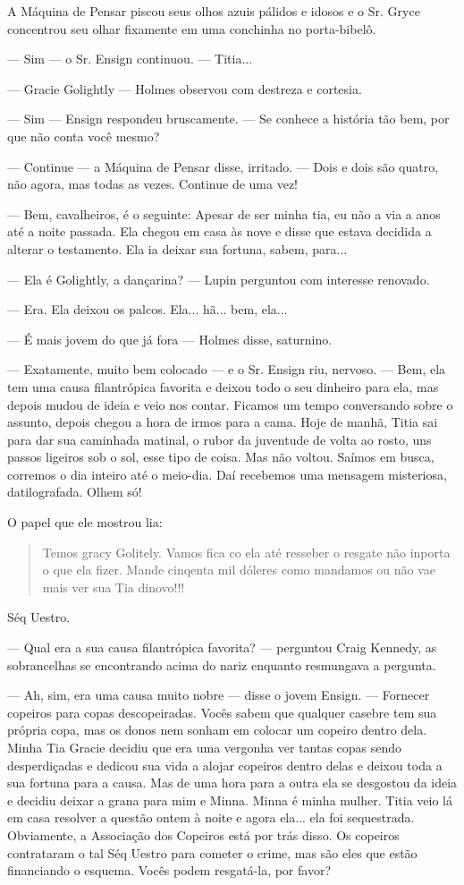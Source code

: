 A Máquina de Pensar piscou seus olhos azuis pálidos e idosos e o Sr.
Gryce concentrou seu olhar fixamente em uma conchinha no porta-bibelô.

--- Sim --- o Sr. Ensign continuou. --- Titia...

--- Gracie Golightly --- Holmes observou com destreza e cortesia.

--- Sim --- Ensign respondeu bruscamente. --- Se conhece a história tão
bem, por que não conta você mesmo?

--- Continue --- a Máquina de Pensar disse, irritado. --- Dois e dois
são quatro, não agora, mas todas as vezes. Continue de uma vez!

--- Bem, cavalheiros, é o seguinte: Apesar de ser minha tia, eu não a
via a anos até a noite passada. Ela chegou em casa às nove e disse que
estava decidida a alterar o testamento. Ela ia deixar sua fortuna,
sabem, para...

--- Ela é Golightly, a dançarina? --- Lupin perguntou com interesse
renovado.

--- Era. Ela deixou os palcos. Ela... hã... bem, ela...

--- É mais jovem do que já fora --- Holmes disse, saturnino.

--- Exatamente, muito bem colocado --- e o Sr. Ensign riu, nervoso. ---
Bem, ela tem uma causa filantrópica favorita e deixou todo o seu
dinheiro para ela, mas depois mudou de ideia e veio nos contar. Ficamos
um tempo conversando sobre o assunto, depois chegou a hora de irmos para
a cama. Hoje de manhã, Titia sai para dar sua caminhada matinal, o rubor
da juventude de volta ao rosto, uns passos ligeiros sob o sol, esse tipo
de coisa. Mas não voltou. Saímos em busca, corremos o dia inteiro até o
meio-dia. Daí recebemos uma mensagem misteriosa, datilografada. Olhem
só!

O papel que ele mostrou lia:

\begin{quote}
Temos gracy Golitely. Vamos fica co ela até resseber o resgate não
inporta o que ela fizer. Mande cinqenta mil dóleres como mandamos ou não
vae mais ver sua Tia dinovo!!!
\end{quote}

Séq Uestro.

--- Qual era a sua causa filantrópica favorita? --- perguntou Craig
Kennedy, as sobrancelhas se encontrando acima do nariz enquanto
resmungava a pergunta.

--- Ah, sim, era uma causa muito nobre --- disse o jovem Ensign. ---
Fornecer copeiros para copas descopeiradas. Vocês sabem que qualquer
casebre tem sua própria copa, mas os donos nem sonham em colocar um
copeiro dentro dela. Minha Tia Gracie decidiu que era uma vergonha ver
tantas copas sendo desperdiçadas e dedicou sua vida a alojar copeiros
dentro delas e deixou toda a sua fortuna para a causa. Mas de uma hora
para a outra ela se desgostou da ideia e decidiu deixar a grana para mim
e Minna. Minna é minha mulher. Titia veio lá em casa resolver a questão
ontem à noite e agora ela... ela foi sequestrada. Obviamente, a
Associação dos Copeiros está por trás disso. Os copeiros contrataram o
tal Séq Uestro para cometer o crime, mas são eles que estão financiando
o esquema. Vocês podem resgatá-la, por favor?

